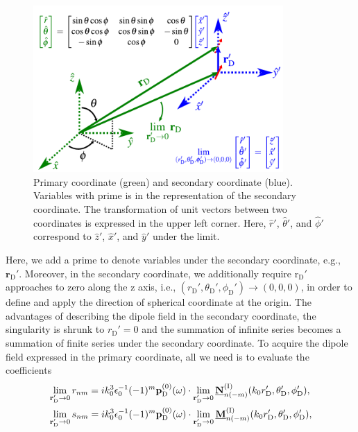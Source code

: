 \documentclass[journal=jacsat,manuscript=article,layout=traditional]{achemso}
\newcommand*\br{\mathbf{r}}
\newcommand{\norF}[1]{\underline{\vb{#1}}}
\newcommand{\RomanI}{\scriptsize\textrm{I}}
\begin{document}
\begin{figure}[!b]
    \centering
    \includegraphics[width=0.85\textwidth]{Figures/limcoordinate.pdf}
    \caption{Primary coordinate (green) and secondary coordinate (blue). Variables with prime is in the representation of the secondary coordinate. The transformation of unit vectors between two coordinates is expressed in the upper left corner. Here, $\hat{r}'$, $\hat{\theta}'$, and $\hat{\phi}'$ correspond to $\hat{z}'$, $\hat{x}'$, and $\hat{y}'$ under the limit.}
    \label{fig:limcoord}
\end{figure}
Here, we add a prime to denote variables under the secondary coordinate, e.g., $\br_\mathrm{D}'$.
Moreover, in the secondary coordinate, we additionally require $\mathrm{r}_\mathrm{D}'$ approaches to zero along the z axis, i.e.,  $(r_\mathrm{D}',\theta_\mathrm{D}',\phi_\mathrm{D}')\rightarrow(0,0,0)$, in order to define and apply the direction of spherical coordinate at the origin.
The advantages of describing the dipole field in the secondary coordinate, the singularity is shrunk to $r_\mathrm{D}'=0$ and the summation of infinite series becomes a summation of finite series under the secondary coordinate.
To acquire the dipole field expressed in the primary coordinate, all we need is to evaluate the coefficients
\begin{align}
    &\lim_{\br_\mathrm{D}'\rightarrow0}r_{nm} = 
    ik_0^3\epsilon_0^{-1}(-1)^m\mathbf{p}_\mathrm{D}^{(0)}(\omega)\cdot\lim_{\br_\mathrm{D}'\rightarrow0}\norF{N}_{n(-m)}^{(\RomanI)}(k_0r_\mathrm{D}',\theta_\mathrm{D}',\phi_\mathrm{D}'),\\
    &\lim_{\br_\mathrm{D}'\rightarrow0}s_{nm} = 
    ik_0^3\epsilon_0^{-1}(-1)^m\mathbf{p}_\textrm{D}^{(0)}(\omega)\cdot\lim_{\br_\mathrm{D}'\rightarrow0}\norF{M}_{n(-m)}^{(\RomanI)}(k_0r_\mathrm{D}',\theta_\mathrm{D}',\phi_\mathrm{D}'),
\end{align}
\end{document}
